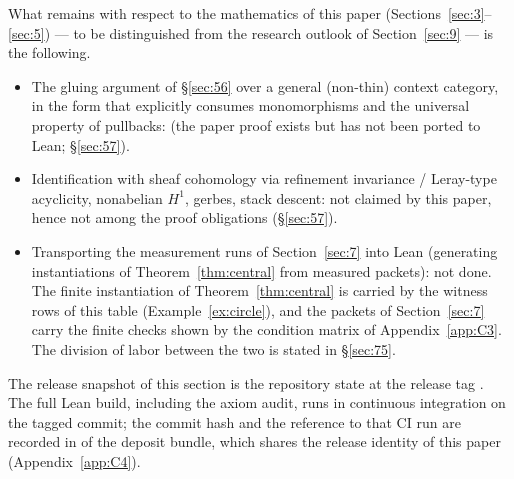 What remains with respect to the mathematics of this paper
(Sections~\ref{sec:3}--\ref{sec:5}) --- to be distinguished from the
research outlook of Section~\ref{sec:9} --- is the following.
\begin{itemize}
\item The gluing argument of \S\ref{sec:56} over a general (non-thin)
context category, in the form that explicitly consumes monomorphisms
and the universal property of pullbacks:  (the paper
proof exists but has not been ported to Lean; \S\ref{sec:57}).
\item Identification with sheaf cohomology via refinement invariance /
Leray-type acyclicity, nonabelian $H^1$, gerbes, stack descent: not
claimed by this paper, hence not among the proof obligations
(\S\ref{sec:57}).
\item Transporting the measurement runs of Section~\ref{sec:7} into
Lean (generating instantiations of Theorem~\ref{thm:central} from
measured packets): not done. The finite instantiation of
Theorem~\ref{thm:central} is carried by the witness rows of this table
(Example~\ref{ex:circle}), and the packets of Section~\ref{sec:7} carry
the finite checks shown by the condition matrix of Appendix~\ref{app:C3}. The
division of labor between the two is stated in \S\ref{sec:75}.
\end{itemize}

The release snapshot of this section is the repository state at the
release tag \allowbreak{}. The full Lean build, including
the axiom audit, runs in continuous integration on the tagged commit;
the commit hash and the reference to that CI run are recorded in
 of the deposit bundle, which shares the release
identity of this paper (Appendix~\ref{app:C4}).
